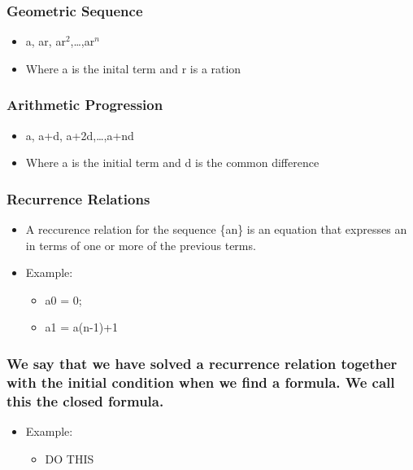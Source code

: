 \documentclass[11pt]{article}
\begin{document}
\subsubsection{Geometric Sequence}
\label{sec-2-4-3}
\begin{itemize}

\item a, ar, ar$^2$,\ldots{},ar$^n$
\label{sec-2-4-3-1}%

\item Where a is the inital term and r is a ration
\label{sec-2-4-3-2}%
\end{itemize} %
\subsubsection{Arithmetic Progression}
\label{sec-2-4-4}
\begin{itemize}

\item a, a+d, a+2d,\ldots{},a+nd
\label{sec-2-4-4-1}%

\item Where a is the initial term and d is the common difference
\label{sec-2-4-4-2}%
\end{itemize} %
\subsubsection{Recurrence Relations}
\label{sec-2-4-5}
\begin{itemize}

\item A reccurence relation for the sequence \{an\} is an equation that expresses an in terms of one or more of the previous terms.
\label{sec-2-4-5-1}%

\item Example:
\label{sec-2-4-5-2}%
\begin{itemize}

\item a0 = 0;
\label{sec-2-4-5-2-1}%

\item a1 = a(n-1)+1
\label{sec-2-4-5-2-2}%
\end{itemize} %
\end{itemize} %
\subsubsection{We say that we have solved a recurrence relation together with the initial condition when we find a formula. We call this the closed formula.}
\label{sec-2-4-6}
\begin{itemize}

\item Example:
\label{sec-2-4-6-1}%
\begin{itemize}

\item DO THIS
\label{sec-2-4-6-1-1}%
\end{itemize} %
\end{itemize} %
\end{document}
